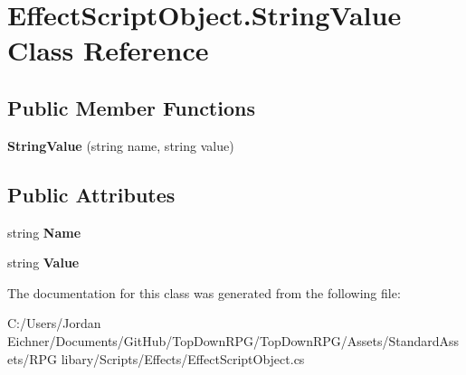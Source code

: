 \hypertarget{class_effect_script_object_1_1_string_value}{}\section{Effect\+Script\+Object.\+String\+Value Class Reference}
\label{class_effect_script_object_1_1_string_value}
\subsection*{Public Member Functions}
\begin{DoxyCompactItemize}
\item 
\hypertarget{class_effect_script_object_1_1_string_value_afc4b7dd444e28462edd5d2796d736b98}{}{\bfseries String\+Value} (string name, string value)\label{class_effect_script_object_1_1_string_value_afc4b7dd444e28462edd5d2796d736b98}

\end{DoxyCompactItemize}
\subsection*{Public Attributes}
\begin{DoxyCompactItemize}
\item 
\hypertarget{class_effect_script_object_1_1_string_value_ae654f4ac63b2a53d82b857b77e3c23ca}{}string {\bfseries Name}\label{class_effect_script_object_1_1_string_value_ae654f4ac63b2a53d82b857b77e3c23ca}

\item 
\hypertarget{class_effect_script_object_1_1_string_value_a14dc217e730e132de31929bc718dd2e6}{}string {\bfseries Value}\label{class_effect_script_object_1_1_string_value_a14dc217e730e132de31929bc718dd2e6}

\end{DoxyCompactItemize}


The documentation for this class was generated from the following file\+:\begin{DoxyCompactItemize}
\item 
C\+:/\+Users/\+Jordan Eichner/\+Documents/\+Git\+Hub/\+Top\+Down\+R\+P\+G/\+Top\+Down\+R\+P\+G/\+Assets/\+Standard\+Assets/\+R\+P\+G libary/\+Scripts/\+Effects/Effect\+Script\+Object.\+cs\end{DoxyCompactItemize}
